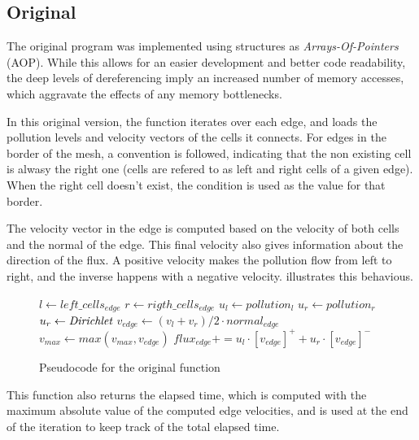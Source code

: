 \subsection{Original}
\label{sec:310}

The original \polu program was implemented using structures as \textit{Arrays-Of-Pointers} (AOP). While this allows for an easier development and better code readability, the deep levels of dereferencing imply an increased number of memory accesses, which aggravate the effects of any memory bottlenecks.

In this original version, the \computeflux function iterates over each edge, and loads the pollution levels and velocity vectors of the cells it connects. For edges in the border of the mesh, a convention is followed, indicating that the non existing cell is alwasy the right one (cells are refered to as left and right cells of a given edge). When the right cell doesn't exist, the \dirichlet condition is used as the value for that border.

The velocity vector in the edge is computed based on the velocity of both cells and the normal of the edge. This final velocity also gives information about the direction of the flux. A positive velocity makes the pollution flow from left to right, and the inverse happens with a negative velocity.  illustrates this behavious.



\begin{figure}[!htp]
	\begin{alg}
			\State $l     \gets left\_cells_{edge}$
			\State $r     \gets rigth\_cells_{edge}$
			\State $u_{l} \gets pollution_{l}$
				\State $u_{r} \gets pollution_{r}$
			\Else
				\State $u_{r} \gets \textit{Dirichlet}$ 
			\EndIf
			\State $v_{edge} \gets (v_{l} + v_{r}) / 2 \cdot normal_{edge}$
			\State $v_{max} \gets max(v_{max}, v_{edge})$
			\State $flux_{edge} += u_{l} \cdot [v_{edge}]^{+} + u_{r} \cdot [v_{edge}]^{-}$
		\EndFor
	\end{alg}

	\caption{Pseudocode for the original \computeflux function}
	\label{alg:flux}
\end{figure}

This function also returns the elapsed time, which is computed with the maximum absolute value of the computed edge velocities, and is used at the end of the iteration to keep track of the total elapsed time.

